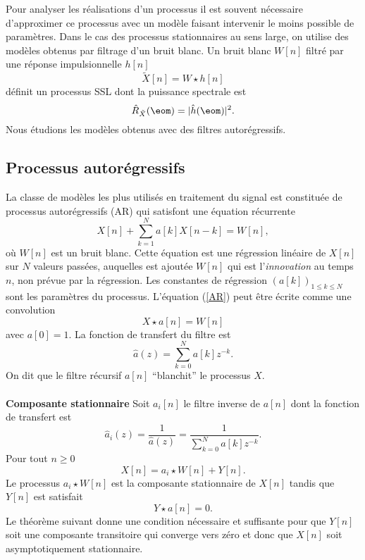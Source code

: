 Pour analyser les r\'ealisations d'un processus 
il est souvent n\'ecessaire d'approximer ce processus avec un
mod\`ele faisant intervenir le moins possible de param\`etres.
Dans le cas des processus stationnaires au sens large,
on utilise des mod\`eles obtenus par filtrage d'un bruit blanc.
Un bruit blanc $W[n]$ filtr\'e par une r\'eponse impulsionnelle $h[n]$
\[
\tilde X [n] = W \star h [n]
\]
d\'efinit un processus SSL dont la puissance spectrale est
\[
\hat R_{\tilde X} (\eom ) = |\hat h (\eom)|^ 2 .
\]
Nous \'etudions les mod\`eles obtenus avec des filtres 
autor\'egressifs.

\subsection{Processus autor\'egressifs}
\label{proc-autoregre-se}

La classe de mod\`eles les plus utilis\'es en traitement du signal
est constitu\'ee de processus autor\'egressifs (AR) qui satisfont
une \'equation r\'ecurrente
\begin{equation}
\label{AR}
X[n] + \sum_{k=1}^N a[k] X[n-k] =  W[n] ,
\end{equation}
o\`u $W [n]$ est un bruit blanc.
Cette \'equation est
une r\'egression lin\'eaire de $X[n]$
sur $N$ valeurs pass\'ees, auquelles est
ajout\'ee $W [n]$ qui est l'{\em innovation} au temps $n$, non
pr\'evue par la r\'egression.
Les constantes de r\'egression $(a[k] )_{1 \leq k \leq N}$ sont les
param\`etres du processus.
L'\'equation (\ref{AR}) peut \^etre \'ecrite comme une convolution
\begin{equation}
\label{eq}
X \star a[n] = W[n]
\end{equation}
avec $a[0] = 1$. La fonction de transfert 
du filtre est
\[
\hat a (z) = \sum_{k=0}^N a[k] z^{-k} .
\]
On dit que le filtre r\'ecursif $a[n]$ ``blanchit'' le processus $X$.
\\
\\
{\bf Composante stationnaire}
Soit $a_i [n]$ le 
filtre inverse de $a[n]$ dont la 
fonction de transfert est
\[
\hat a_i (z) = \frac 1 {\hat a (z)} = \frac 1 
{\sum_{k=0}^N a[k] z^{-k}} .
\]
Pour tout $n \geq 0$
\[
X[n] = a_i \star W [n] + Y [n] .
\]
Le processus $a_i \star W [n]$ est la composante stationnaire
de $X[n]$
tandis que $Y[n]$ est satisfait
\[
Y \star a [n] = 0 .
\]
Le th\'eor\`eme suivant donne une condition n\'ecessaire et
suffisante pour que $Y[n]$ soit une composante transitoire qui
converge vers z\'ero et donc que $X[n]$
soit asymptotiquement stationnaire.

